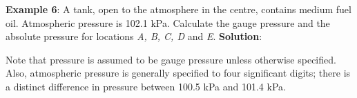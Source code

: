 \documentclass[10pt]{amsart}
\begin{document}
\begin{minipage}[t]{0.45\textwidth}
	\raggedright	
	\textbf{Example 6}:
	A tank, open to the atmosphere in the centre, contains medium fuel
	oil. Atmospheric pressure is 102.1 kPa. Calculate the gauge pressure
	and the absolute pressure for locations \emph{A, B, C, D} and \emph{E}.
	\parb
	\textbf{Solution}:
	\parb

	\parb
	Note that pressure is assumed to be gauge pressure unless otherwise specified.\parb
	Also, atmospheric pressure is generally specified to four significant digits; there is a distinct
	difference in pressure between 100.5 kPa and 101.4 kPa.
	

				
	\parb
	
\end{minipage}
\hfill
\end{document}
